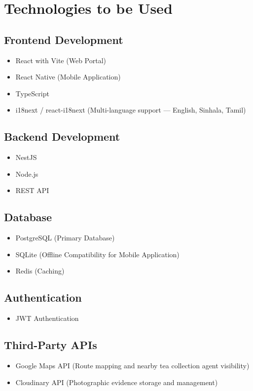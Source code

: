 \section{Technologies to be Used}
\label{sec:technologies}

\subsection{Frontend Development}
\begin{itemize}
    \item React with Vite (Web Portal)
    \item React Native (Mobile Application)
    \item TypeScript
    \item i18next / react-i18next (Multi-language support — English, Sinhala, Tamil)
\end{itemize}

\subsection{Backend Development}
\begin{itemize}
    \item NestJS
    \item Node.js
    \item REST API
\end{itemize}

\subsection{Database}
\begin{itemize}
    \item PostgreSQL (Primary Database)
    \item SQLite (Offline Compatibility for Mobile Application)
    \item Redis (Caching)
\end{itemize}

\subsection{Authentication}
\begin{itemize}
    \item JWT Authentication
\end{itemize}

\subsection{Third-Party APIs}
\begin{itemize}
    \item Google Maps API (Route mapping and nearby tea collection agent visibility)
    \item Cloudinary API (Photographic evidence storage and management)
\end{itemize}

